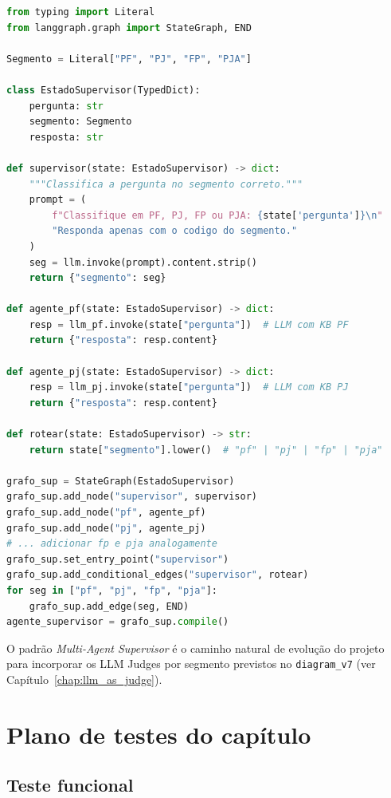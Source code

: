 \begin{lstlisting}[language=Python,
  caption={Esbo\c{c}o do padr\~ao \textit{Multi-Agent Supervisor} com \textit{LangGraph}.},
  label={lst:multi_agent_supervisor}]
from typing import Literal
from langgraph.graph import StateGraph, END

Segmento = Literal["PF", "PJ", "FP", "PJA"]

class EstadoSupervisor(TypedDict):
    pergunta: str
    segmento: Segmento
    resposta: str

def supervisor(state: EstadoSupervisor) -> dict:
    """Classifica a pergunta no segmento correto."""
    prompt = (
        f"Classifique em PF, PJ, FP ou PJA: {state['pergunta']}\n"
        "Responda apenas com o codigo do segmento."
    )
    seg = llm.invoke(prompt).content.strip()
    return {"segmento": seg}

def agente_pf(state: EstadoSupervisor) -> dict:
    resp = llm_pf.invoke(state["pergunta"])  # LLM com KB PF
    return {"resposta": resp.content}

def agente_pj(state: EstadoSupervisor) -> dict:
    resp = llm_pj.invoke(state["pergunta"])  # LLM com KB PJ
    return {"resposta": resp.content}

def rotear(state: EstadoSupervisor) -> str:
    return state["segmento"].lower()  # "pf" | "pj" | "fp" | "pja"

grafo_sup = StateGraph(EstadoSupervisor)
grafo_sup.add_node("supervisor", supervisor)
grafo_sup.add_node("pf", agente_pf)
grafo_sup.add_node("pj", agente_pj)
# ... adicionar fp e pja analogamente
grafo_sup.set_entry_point("supervisor")
grafo_sup.add_conditional_edges("supervisor", rotear)
for seg in ["pf", "pj", "fp", "pja"]:
    grafo_sup.add_edge(seg, END)
agente_supervisor = grafo_sup.compile()
\end{lstlisting}

O padr\~ao \textit{Multi-Agent Supervisor} \'e o caminho natural de
evolu\c{c}\~ao do projeto para incorporar os LLM Judges por segmento
previstos no \texttt{diagram\_v7} (ver Cap\'itulo~\ref{chap:llm_as_judge}).

\section{Plano de testes do cap\'itulo}

\subsection{Teste funcional}


